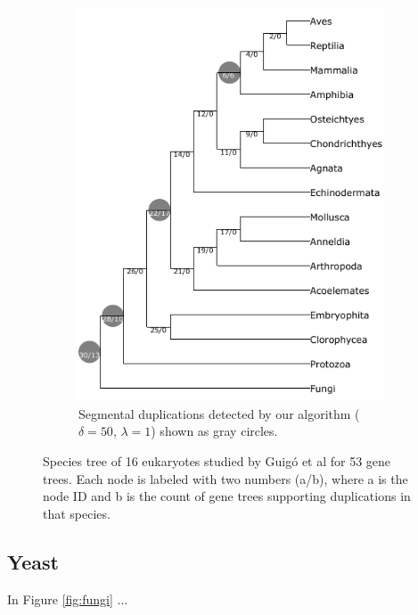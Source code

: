 \documentclass[10pt]{article}
\begin{document}
\begin{figure}[h!]
\begin{subfigure}[b]{0.48\textwidth}
        \includegraphics[scale=0.7]{figs/guigo_greedy70.pdf} %
        \caption{Segmental duplications detected by our algorithm ($\delta=50$, $\lambda=1$) shown as gray circles.}
        \label{fig:guigo-greedy}
    \end{subfigure}
    
    \caption{
        Species tree of 16 eukaryotes studied by Guigó et al for 53 gene trees. Each node is labeled with two numbers (a/b), where a is the node ID and b is the count of gene trees supporting duplications in that species.
    }
    \label{fig:guigo}
\end{figure}

\subsection{Yeast}
In Figure \ref{fig:fungi} ...
\end{document}
